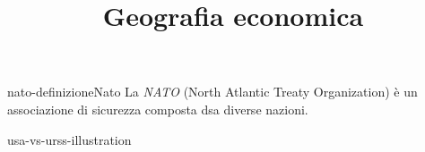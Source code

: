 \documentclass[preview]{standalone}
\begin{document}
\title{Geografia economica}
\genpage

\begin{snippetdefinition}{nato-definizione}{Nato}
    La \textit{NATO} (North Atlantic Treaty Organization) è un associazione di sicurezza composta dsa diverse nazioni.
\end{snippetdefinition}

\begin{snippet}{usa-vs-urss-illustration}
    \begin{center}
    \end{center}
    \phantom{}
\end{snippet}

\end{document}
